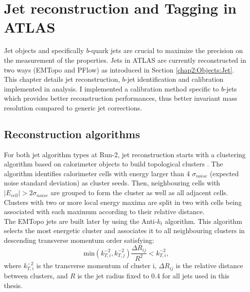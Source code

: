 \chapter{Jet reconstruction and Tagging in ATLAS}
\label{Jet}
Jet objects and specifically $b$-quark jets are crucial to maximize the precision on the measurement of the \HHyybb properties. Jets in ATLAS are currently reconstructed in two ways (EMTopo and PFlow) as introduced in Section \ref{chap2:Objects:Jet}. This chapter details jet reconstruction, $b$-jet identification and calibration implemented in \HHyybb analysis. I implemented a calibration method specific to $b$-jets which provides better reconstruction performances, thus better \mbb invariant mass resolution compared to generic jet corrections.

\section{Reconstruction algorithms}
\label{Jet:JR}
For both jet algorithm types at Run-2, jet reconstruction starts with a clustering algorithm based on calorimeter objects to build topological clusters \cite{Jet_Algo_Perf}. The algorithm identifies calorimeter cells with energy larger than 4 $\sigma_{noise}$ (expected noise standard deviation) as cluster seeds. Then, neighbouring cells with $|E_{cell}| > 2\sigma_{noise}$ are grouped to form the cluster as well as all adjacent cells. Clusters with two or more local energy maxima are split in two with cells being associated with each maximum according to their relative distance. \\
The EMTopo jets are built later by using the Anti-$k_t$ algorithm. This algorithm selects the most energetic cluster and associates it to all neighbouring clusters in descending transverse momentum order satisfying:
\begin{equation}
    \text{min}(k_{T,i}^{-2}, k_{T,j}^{-2}) \frac{\Delta R_{ij}}{R^2} < k_{T,i}^{-2},
\end{equation}
where $k_{T,i}^{-2}$ is the transverse momentum of cluster i, $\Delta R_{ij}$ is the relative distance between clusters, and $R$ is the jet radius fixed to 0.4 for all jets used in this thesis. \\
